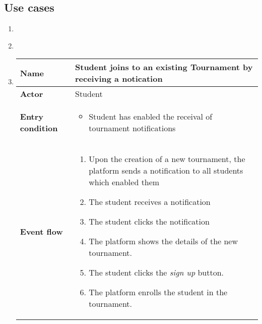 \subsection{Use cases}
\begin{enumerate}[label=\textbf{UC\arabic*}:,leftmargin=1.3cm]
      \item
      \item \textbf{}
            \pagebreak
      \item \textbf{}
            \begin{table}[H]
                  \centering
                  \begin{tabular}{|l|p{11.9cm}|}
                        \hline
                        \textbf{Name}            & Student joins to an existing Tournament by receiving a notication                     \\\hline
                        \textbf{Actor}           & Student                                                                               \\\hline
                        \textbf{Entry condition} &
                        \begin{itemize}
                              \item Student has enabled the receival of tournament notifications
                        \end{itemize}                                                \\\hline
                        \textbf{Event flow}      &
                        \begin{enumerate}[label=\arabic*.]
                              \item Upon the creation of a new tournament, the platform sends a notification to all students which enabled them
                              \item The student receives a notification
                              \item The student clicks the notification
                              \item The platform shows the details of the new tournament.
                              \item The student clicks the \emph{sign up} button.
                              \item The platform enrolls the student in the tournament.

\end{enumerate}
\end{tabular}
\end{table}
\end{enumerate}
